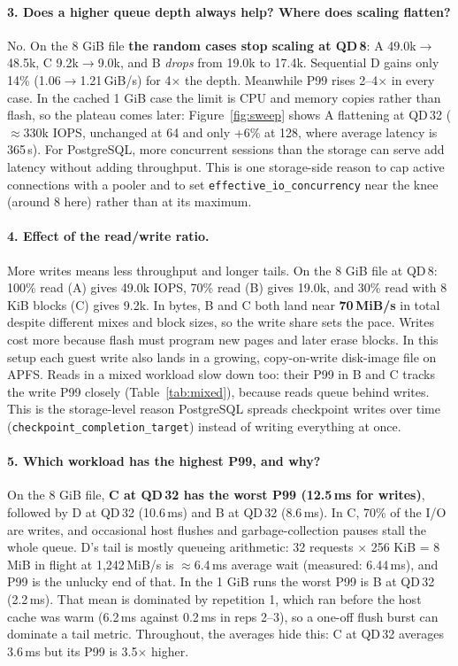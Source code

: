 \documentclass[11pt,a4paper]{article}
\begin{document}
\paragraph{3. Does a higher queue depth always help? Where does scaling flatten?}
No. On the 8 GiB file \textbf{the random cases stop scaling at QD\,8}: A 49.0k$\to$48.5k, C 9.2k$\to$9.0k,
and B \emph{drops} from 19.0k to 17.4k. Sequential D gains only 14\% (1.06$\to$1.21\,GiB/s) for 4$\times$ the depth. Meanwhile P99 rises 2--4$\times$ in every case.
In the cached 1 GiB case the limit is CPU and memory copies rather than flash, so the plateau comes later:
Figure~\ref{fig:sweep} shows A flattening at QD\,32 ($\approx$330k IOPS, unchanged at 64 and only +6\% at 128,
where average latency is 365\,\textmu s). For PostgreSQL, more concurrent sessions than the storage can serve
add latency without adding throughput. This is one storage-side reason to cap active connections with a pooler
and to set \texttt{effective\_io\_concurrency} near the knee (around 8 here) rather than at its maximum.

\paragraph{4. Effect of the read/write ratio.}
More writes means less throughput and longer tails. On the 8 GiB file at QD\,8: 100\% read (A) gives 49.0k IOPS,
70\% read (B) gives 19.0k, and 30\% read with 8 KiB blocks (C) gives 9.2k. In bytes, B and C both land near
\textbf{70\,MiB/s} in total despite different mixes and block sizes, so the write share sets the pace. Writes cost more
because flash must program new pages and later erase blocks. In this setup each guest write also lands in a
growing, copy-on-write disk-image file on APFS. Reads in a mixed workload slow down too: their P99 in B and C
tracks the write P99 closely (Table~\ref{tab:mixed}), because reads queue behind writes. This is the storage-level
reason PostgreSQL spreads checkpoint writes over time (\texttt{checkpoint\_completion\_target}) instead of
writing everything at once.

\paragraph{5. Which workload has the highest P99, and why?}
On the 8 GiB file, \textbf{C at QD\,32 has the worst P99 (12.5\,ms for writes)}, followed by D at QD\,32
(10.6\,ms) and B at QD\,32 (8.6\,ms). In C, 70\% of the I/O are writes, and occasional
host flushes and garbage-collection pauses stall the whole queue. D's tail is mostly queueing arithmetic:
32 requests $\times$ 256 KiB = 8 MiB in flight at 1{,}242\,MiB/s is $\approx$6.4\,ms average wait (measured: 6.44\,ms), and P99 is the
unlucky end of that. In the 1 GiB runs the worst P99 is B at QD\,32 (2.2\,ms). That mean is dominated by
repetition 1, which ran before the host cache was warm (6.2\,ms against 0.2\,ms in reps 2--3), so a one-off
flush burst can dominate a tail metric. Throughout, the averages hide this: C at QD\,32 averages
3.6\,ms but its P99 is 3.5$\times$ higher.
\end{document}
